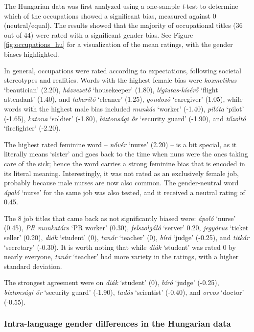 \documentclass[11pt]{article}
\begin{document}
The Hungarian data was first analyzed using a one-sample \textit{t}-test to determine which of the occupations showed a significant bias, measured against 0 (neutral/equal). The results showed that the majority of occupational titles (36 out of 44) were rated with a significant gender bias. See Figure \ref{fig:occupations_hu} for a visualization of the mean ratings, with the gender biases highlighted.

In general, occupations were rated according to expectations, following societal stereotypes and realities. Words with the highest female bias were \textit{kozmetikus} `beautician' (2.20), \textit{házvezető} `housekeeper' (1.80), \textit{légiutas-kísérő} `flight attendant' (1.40), and \textit{takarító} `cleaner' (1.25), \textit{gondozó} `caregiver' (1.05), while words with the highest male bias included \textit{munkás} `worker' (-1.40), \textit{pilóta} `pilot' (-1.65), \textit{katona} `soldier' (-1.80), \textit{biztonsági őr} `security guard' (-1.90), and \textit{tűzoltó} `firefighter' (-2.20).

The highest rated feminine word -- \textit{nővér} `nurse' (2.20) -- is a bit special, as it literally means `sister' and goes back to the time when nuns were the ones taking care of the sick; hence the word carries a strong feminine bias that is encoded in its literal meaning. Interestingly, it was not rated as an exclusively female job, probably because male nurses are now also common. The gender-neutral word \textit{ápoló} `nurse' for the same job was also tested, and it received a neutral rating of 0.45.

The 8 job titles that came back as not significantly biased were: \textit{ápoló} `nurse' (0.45), \textit{PR munkatárs} `PR worker' (0.30), \textit{felszolgáló} `server' 0.20, \textit{jegyárus} `ticket seller' (0.20), \textit{diák} `student' (0), \textit{tanár} `teacher' (0), \textit{bíró} `judge' (-0.25), and \textit{titkár} `secretary' (-0.30). It is worth noting that while \textit{diák} `student' was rated 0 by nearly everyone, \textit{tanár} `teacher' had more variety in the ratings, with a higher standard deviation.

The strongest agreement were on \textit{diák} `student' (0), \textit{bíró} `judge' (-0.25), \textit{biztonsági őr} `security guard' (-1.90), \textit{tudós} `scientist' (-0.40), and \textit{orvos} `doctor' (-0.55).

\subsubsection{Intra-language gender differences in the Hungarian data}
\end{document}
